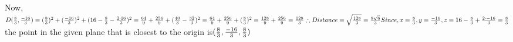 \documentclass{article}
\begin{document}
\begin{newpage}
{Now, \\[3mm]
$D(\frac{8}{3},\frac{-16}{3})=(\frac{8}{3})^2+(\frac{-16}{3})^2+(16-\frac{8}{3}-\frac{2\cdot 16}{3})^2\\[3mm]
=\frac{64}{9}+\frac{256}{9}+(\frac{40}{3}-\frac{32}{3})^2\\[3mm]
=\frac{64}{9}+\frac{256}{9}+(\frac{8}{3})^2\\[3mm]
=\frac{128}{9}+\frac{256}{9}\\[3mm]
=\frac{128}{3}\\[3mm]
\therefore Distance= \sqrt{\frac{128}{3}}=\frac{8\sqrt{6}}{3}\\[3mm]
Since, x=\frac{8}{3}, y=\frac{-16}{3},\\[3mm]
z=16-\frac{8}{3}+\frac{2\cdot-16}{3}=\frac{8}{3}\\[3mm]$
the point in the given plane that is closest to the origin is$(\frac{8}{3},\frac{-16}{3},\frac{8}{3})\\[3mm]$}
\end{newpage}
\end{document}
